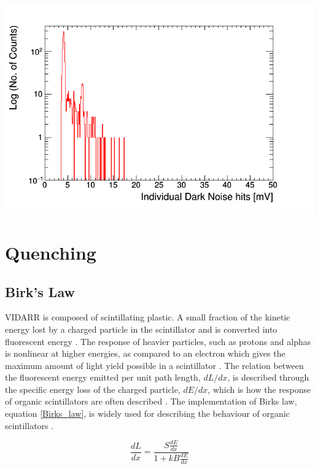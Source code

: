 \documentclass[12pt,a4paper]{article}
\newenvironment{Figure}
  {\par\medskip\noindent\minipage{\linewidth}}
  {\endminipage\par\medskip}
\begin{document}
\begin{Figure}
 \centering
 \includegraphics[height=90mm]{DarkNois_10E6_15kHz.png}
 \label{dark_noise_10E6_15Hz}
\end{Figure}


\section{Quenching}
\subsection{Birk's Law}
VIDARR is composed of scintillating plastic. A small fraction of the kinetic energy lost by a charged particle in the scintillator and is converted into fluorescent energy \cite{rad_det_and_meas}. The response of heavier particles, such as protons and alphas is nonlinear at higher energies, as compared to an electron which gives the maximum amount of light yield possible in a scintillator \cite{rad_det_and_meas}. The relation between the fluorescent energy emitted per unit path length, $dL/dx$, is described through the specific energy loss of the charged particle, $dE/dx$, which is how the response of organic scintillators are often described \cite{rad_det_and_meas}. The implementation of Birks law, equation \ref{Birks_law}, is widely used for describing the behaviour of organic scintillators \cite{rad_det_and_meas} \cite{birks_book}.

\begin{equation}
\frac{dL}{dx} = \frac{S\frac{dE}{dx}}{1 + kB \frac{dE}{dx}}
\label{Birks_law}
\end{equation}
~\\
\end{document}
